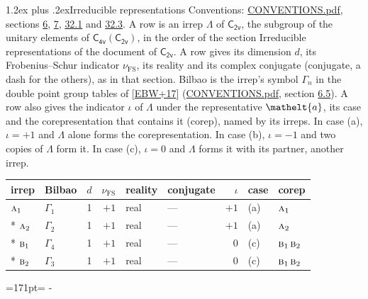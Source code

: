 \documentclass[10pt,a4paper]{article}
\makeatletter
\renewcommand\section{\@startsection{section}{1}{\z@}{-3ex plus -1ex minus -.2ex}%
  {1.2ex plus .2ex}{\normalfont\large\sffamily\bfseries\color{parttitle}}}
\newcommand{\needspace}[1]{\par\penalty-100\begingroup\dimen0=#1\relax\dimen2=\pagegoal
  \advance\dimen2-\pagetotal\ifdim\dimen0>\dimen2\relax\ifdim\dimen2>0pt\vfil\break\fi\fi
  \endgroup}
\numberwithin{equation}{section}
\newcommand{\eltfont}[1]{{\let\sigma\eltsigma\mathelt{#1}}}
\newcommand{\grp}[1]{\mathsf{#1}}
\newcommand{\irr}[1]{\text{\normalfont\scshape #1}}
\newcommand{\elt}[1]{\eltfont{#1}}
\newcommand{\fsind}{\nu_{\mathrm{FS}}}
\makeatother
\begin{document}
\section{Irreducible representations}\label{s:irreps}
Conventions: \href{../../CONVENTIONS.pdf}{CONVENTIONS.pdf}, sections \href{../../../rotation/CONVENTIONS.pdf\#conv.6}{6}, \href{../../../rotation/CONVENTIONS.pdf\#conv.7}{7}, \href{../../CONVENTIONS.pdf\#conv.32.1}{32.1} and \href{../../CONVENTIONS.pdf\#conv.32.3}{32.3}.
\leavevmode\label{n:irrep.Delta}A row is an irrep $\Lambda$ of $\grp{C_{2v}}$, the subgroup of the unitary elements of $\grp{C_{4v}}(\grp{C_{2v}})$, in the order of the section Irreducible representations of the document of \href{../../../rotation/data/pdf/C2v.pdf}{$\grp{C_{2v}}$}. \label{n:index.dimension}\label{n:index.frobenius}\label{n:head.irrep}\label{n:head.reality}\label{n:head.conjugate}A row gives its dimension $d$, its Frobenius--Schur indicator $\fsind$, its reality and its complex conjugate (conjugate, a dash for the others), as in that section. \label{n:head.bilbao}\label{n:irrep.alias.gamma}Bilbao is the irrep's symbol $\Gamma_n$ in the double point group tables of [\href{../../../REFERENCES.pdf\#ref.EBW+17}{EBW+17}] (\href{../../CONVENTIONS.pdf}{CONVENTIONS.pdf}, section \href{../../../rotation/CONVENTIONS.pdf\#conv.6.5}{6.5}). \label{n:head.case.corep}\label{n:head.corep}A row also gives the indicator $\iota$ of $\Lambda$ under the representative $\elt{a}$, its case and the corepresentation that contains it (corep), named by its irreps. In case (a), $\iota = +1$ and $\Lambda$ alone forms the corepresentation. In case (b), $\iota = -1$ and two copies of $\Lambda$ form it. In case (c), $\iota = 0$ and $\Lambda$ forms it with its partner, another irrep.
\setlength{\emergencystretch}{2em}\par\setlength{\emergencystretch}{0pt}
{\small\renewcommand{\arraystretch}{1.25}\setlength{\tabcolsep}{4pt}\begin{longtable}{@{}llrrllrll@{}}\toprule
irrep & Bilbao & $d$ & $\fsind$ & reality & conjugate & $\iota$ & case & corep\\\midrule\endhead
\bottomrule\endfoot\endlastfoot
$\irr{a}_{1}$ & $\Gamma_{1}$ & 1 & $+1$ & real & --- & $+1$ & (a) & $\irr{a}_{1}$\\*
$\irr{a}_{2}$ & $\Gamma_{2}$ & 1 & $+1$ & real & --- & $+1$ & (a) & $\irr{a}_{2}$\\*
$\irr{b}_{1}$ & $\Gamma_{4}$ & 1 & $+1$ & real & --- & $0$ & (c) & $\irr{b}_{1}\,\irr{b}_{2}$\\*
$\irr{b}_{2}$ & $\Gamma_{3}$ & 1 & $+1$ & real & --- & $0$ & (c) & $\irr{b}_{1}\,\irr{b}_{2}$\\
\bottomrule\end{longtable}}
\needspace{171pt}
\end{document}
